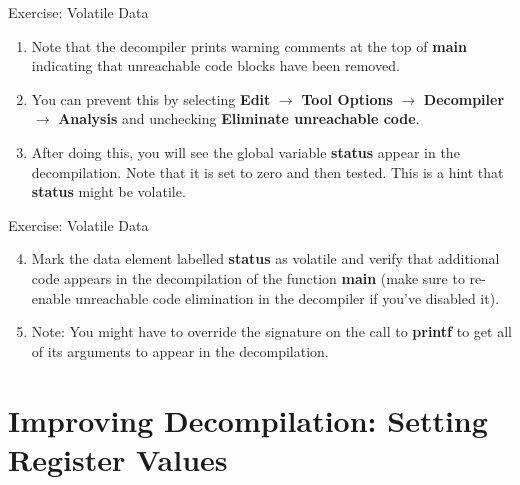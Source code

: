 \documentclass{beamer}
\begin{document}
\begin{frame}
\begin{block}{Exercise: Volatile Data}
\begin{enumerate}
\item Note that the decompiler prints warning comments at the top of \textbf{main} indicating that unreachable code blocks have been removed.
\item You can prevent this by selecting \textbf{Edit} $\rightarrow$ \textbf{Tool Options} $\rightarrow$ \textbf{Decompiler} $\rightarrow$ \textbf{Analysis} and unchecking
\textbf {Eliminate unreachable code}.
\item After doing this, you will see the global variable \textbf{status} appear in the decompilation.  Note that it is set to zero and then tested.  This is a hint that
\textbf{status} might be volatile.
\end{enumerate}
\end{block}
\end{frame}

\begin{frame}
\begin{block}{Exercise: Volatile Data}
\begin{enumerate}
\setcounter{enumi}{3}
\item Mark the data element labelled \textbf{status} as volatile and verify that additional code appears in the decompilation 
of the function \textbf{main} (make sure to re-enable unreachable code elimination in the decompiler if you've disabled it). 
\item Note: You might have to override the signature on the call to \textbf{printf} to get all of its arguments to appear in the decompilation.
\end{enumerate}
\end{block}
\end{frame}

\section{Improving Decompilation: Setting Register Values}
\end{document}

